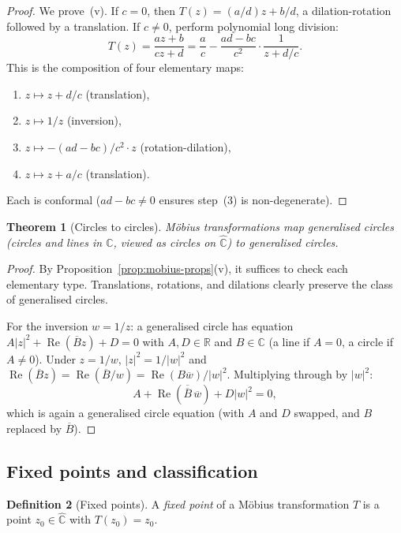 \documentclass[12pt,a4paper,openany]{book}
\theoremstyle{definition}
\newtheorem{definition}{Definition}[chapter]
\theoremstyle{plain}
\newtheorem{theorem}[definition]{Theorem}
\theoremstyle{remark}
\newcommand{\C}{\mathbb{C}}
\newcommand{\R}{\mathbb{R}}
\DeclareMathOperator{\re}{Re}
\newcommand{\abs}[1]{\left|#1\right|}
\newcommand{\conj}[1]{\overline{#1}}
\begin{document}
\begin{proof}
We prove~(v).  If $c=0$, then
$T(z)=(a/d)z+b/d$, a dilation-rotation followed by a translation.
If $c\neq 0$, perform polynomial long division:
\[
  T(z)=\frac{az+b}{cz+d}
  =\frac{a}{c}-\frac{ad-bc}{c^2}\cdot\frac{1}{z+d/c}.
\]
This is the composition of four elementary maps:
\begin{enumerate}[label=(\arabic*)]
  \item $z\mapsto z+d/c$ \quad (translation),
  \item $z\mapsto 1/z$ \quad (inversion),
  \item $z\mapsto -(ad-bc)/c^2\cdot z$ \quad (rotation-dilation),
  \item $z\mapsto z+a/c$ \quad (translation).
\end{enumerate}
Each is conformal ($ad-bc\neq 0$ ensures step~(3) is non-degenerate).
\end{proof}

\begin{theorem}[Circles to circles]\label{thm:mobius-circles}
M\"obius transformations map generalised circles (circles and lines in
$\C$, viewed as circles on $\hat{\C}$) to generalised circles.
\end{theorem}

\begin{proof}
By Proposition~\ref{prop:mobius-props}(v), it suffices to check each
elementary type.  Translations, rotations, and dilations clearly preserve
the class of generalised circles.

For the inversion $w=1/z$: a generalised circle has equation
$A\abs{z}^2+\re(\conj{B}z)+D=0$ with $A,D\in\R$ and $B\in\C$
(a line if $A=0$, a circle if $A\neq 0$).  Under $z=1/w$,
$\abs{z}^2=1/\abs{w}^2$ and $\re(\conj{B}z)=\re(\conj{B}/w)
=\re(B\conj{w})/\abs{w}^2$.
Multiplying through by $\abs{w}^2$:
\[
  A+\re(\conj{\conj{B}}\,\conj{w})+D\abs{w}^2=0,
\]
which is again a generalised circle equation (with $A$ and $D$ swapped,
and $B$ replaced by $\conj{B}$).
\end{proof}

\subsection{Fixed points and classification}\label{ssec:fixed-pts}

\begin{definition}[Fixed points]\label{def:fixed-pts}
A \emph{fixed point} of a M\"obius transformation $T$ is a point
$z_0\in\hat{\C}$ with $T(z_0)=z_0$.
\end{definition}
\end{document}
